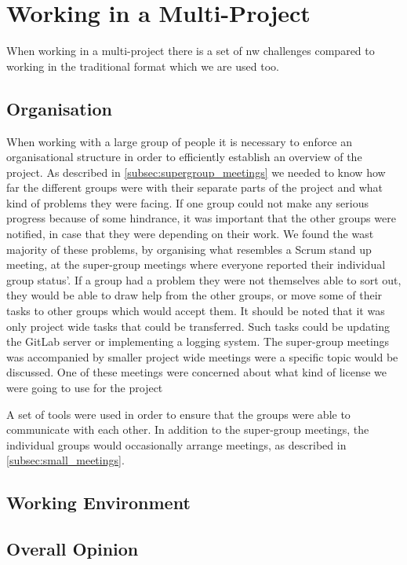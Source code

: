 \section{Working in a Multi-Project}
When working in a multi-project there is a set of nw challenges compared to working in the traditional format which we are used too.

\subsection{Organisation}
When working with a large group of people it is necessary to enforce an organisational structure in order to efficiently establish an overview of the project. As described in \cref{subsec:supergroup_meetings} we needed to know how far the different groups were with their separate parts of the project and what kind of problems they were facing. If one group could not make any serious progress because of some hindrance, it was important that the other groups were notified, in case that they were depending on their work. We found the wast majority of these problems, by organising what resembles a Scrum stand up meeting, at the super-group meetings where everyone reported their individual group status'. If a group had a problem they were not themselves able to sort out, they would be able to draw help from the other groups, or move some of their tasks to other groups which would accept them. It should be noted that it was only project wide tasks that could be transferred. Such tasks could be updating the GitLab server or implementing a logging system. 
The super-group meetings was accompanied by smaller project wide meetings were a specific topic would be discussed. One of these meetings were concerned about what kind of license we were going to use for the project 

A set of tools were used in order to ensure that the groups were able to communicate with each other. In addition to the super-group meetings, the individual groups would occasionally arrange meetings, as described in \cref{subsec:small_meetings}. 


\subsection{Working Environment}


\subsection{Overall Opinion}
